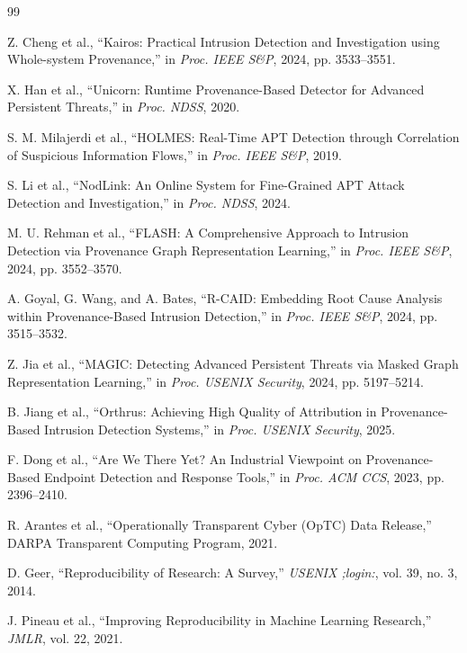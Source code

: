 \documentclass[11pt,a4paper]{article}
\begin{document}
\newpage
\begin{thebibliography}{99}

Z. Cheng et al., ``Kairos: Practical Intrusion Detection and Investigation using Whole-system Provenance,'' in \textit{Proc. IEEE S\&P}, 2024, pp. 3533--3551.

X. Han et al., ``Unicorn: Runtime Provenance-Based Detector for Advanced Persistent Threats,'' in \textit{Proc. NDSS}, 2020.

S. M. Milajerdi et al., ``HOLMES: Real-Time APT Detection through Correlation of Suspicious Information Flows,'' in \textit{Proc. IEEE S\&P}, 2019.

S. Li et al., ``NodLink: An Online System for Fine-Grained APT Attack Detection and Investigation,'' in \textit{Proc. NDSS}, 2024.

M. U. Rehman et al., ``FLASH: A Comprehensive Approach to Intrusion Detection via Provenance Graph Representation Learning,'' in \textit{Proc. IEEE S\&P}, 2024, pp. 3552--3570.

A. Goyal, G. Wang, and A. Bates, ``R-CAID: Embedding Root Cause Analysis within Provenance-Based Intrusion Detection,'' in \textit{Proc. IEEE S\&P}, 2024, pp. 3515--3532.

Z. Jia et al., ``MAGIC: Detecting Advanced Persistent Threats via Masked Graph Representation Learning,'' in \textit{Proc. USENIX Security}, 2024, pp. 5197--5214.

B. Jiang et al., ``Orthrus: Achieving High Quality of Attribution in Provenance-Based Intrusion Detection Systems,'' in \textit{Proc. USENIX Security}, 2025.

F. Dong et al., ``Are We There Yet? An Industrial Viewpoint on Provenance-Based Endpoint Detection and Response Tools,'' in \textit{Proc. ACM CCS}, 2023, pp. 2396--2410.

R. Arantes et al., ``Operationally Transparent Cyber (OpTC) Data Release,'' DARPA Transparent Computing Program, 2021.

D. Geer, ``Reproducibility of Research: A Survey,'' \textit{USENIX ;login:}, vol. 39, no. 3, 2014.

J. Pineau et al., ``Improving Reproducibility in Machine Learning Research,'' \textit{JMLR}, vol. 22, 2021.


\end{thebibliography}
\end{document}
